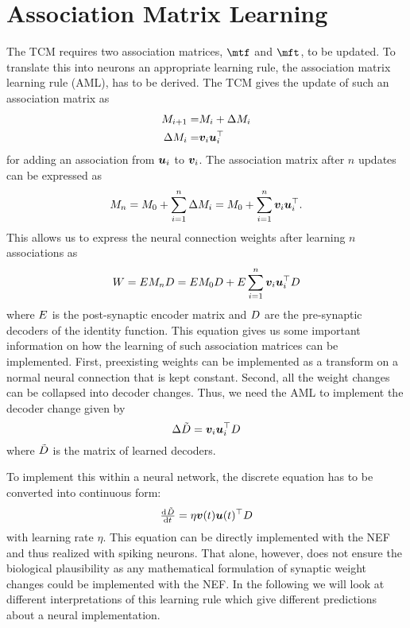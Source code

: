 \chapter{Association Matrix Learning}

The TCM requires two association matrices, $\mtf$ and $\mft$, to be updated.
To translate this into neurons an appropriate learning rule, the association matrix learning rule (AML), has to be derived.
The TCM gives the update of such an association matrix as
\begin{eqnarray}
    M_{i+1} =& M_i + \Delta M_i \\
    \Delta M_i =& \bm{v}_i \bm{u}_i^{\top}
\end{eqnarray}
for adding an association from $\bm{u}_i$ to $\bm{v}_i$.
The association matrix after $n$ updates can be expressed as
\begin{equation}
    M_n = M_0 + \sum_{i=1}^{n} \Delta M_i = M_0 + \sum_{i=1}^n \bm{v}_i \bm{u}_i^{\top} \text{.}
\end{equation}
This allows us to express the neural connection weights after learning $n$ associations as
\begin{equation}
    W = E M_n D = E M_0 D + E \sum_{i=1}^n \bm{v}_i \bm{u}_i^{\top} D
\end{equation}
where $E$ is the post-synaptic encoder matrix and $D$ are the pre-synaptic decoders of the identity function.
This equation gives us some important information on how the learning of such association matrices can be implemented.
First, preexisting weights can be implemented as a transform on a normal neural connection that is kept constant.
Second, all the weight changes can be collapsed into decoder changes.
Thus, we need the AML to implement the decoder change given by
\begin{equation}
    \Delta \tilde{D} = \bm{v}_i \bm{u}_i^{\top} D
\end{equation}
where $\tilde{D}$ is the matrix of learned decoders.

To implement this within a neural network, the discrete equation has to be converted into continuous form:
\begin{equation}
    \od{\tilde{\mat D}}{t} = \eta \vc v(t) \vc u(t)\Tr \mat D \label{eqn:aml}
\end{equation}
with learning rate $\eta$.
This equation can be directly implemented with the NEF and thus realized with spiking neurons.
That alone, however, does not ensure the biological plausibility as any mathematical formulation of synaptic weight changes could be implemented with the NEF\@.
In the following we will look at different interpretations of this learning rule which give different predictions about a neural implementation.

